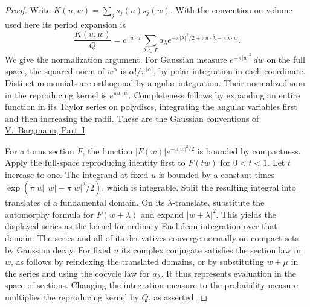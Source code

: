 \documentclass[a4paper,11pt]{article}
\theoremstyle{definition}
\theoremstyle{remark}
\numberwithin{equation}{section}
\begin{document}
\begin{proof}
Write \(K(u,w)=\sum_j s_j(u)\overline{s_j(w)}\). With the
convention on volume used here its period expansion is
\[
 \frac{K(u,w)}{Q}
  =e^{\pi u\cdot\bar w}
    \sum_{\lambda\in\Gamma}a_\lambda
      e^{-\pi|\lambda|^2/2+\pi u\cdot\bar\lambda
                                  -\pi\lambda\cdot\bar w}.
\]
We give the normalization argument. For Gaussian measure
\(e^{-\pi|w|^2}\,dw\) on the full space, the squared norm of
\(w^\alpha\) is \(\alpha!/\pi^{|\alpha|}\), by polar integration
in each coordinate. Distinct monomials are orthogonal by angular
integration. Their normalized sum in the reproducing kernel is
\(e^{\pi u\cdot\bar w}\). Completeness follows by expanding an
entire function in its Taylor series on polydiscs, integrating
the angular variables first and then increasing the radii. These
are the Gaussian conventions of
\href{https://doi.org/10.1002/cpa.3160140303}{V.~Bargmann, Part~I}.

For a torus section \(F\), the function
\(|F(w)|e^{-\pi|w|^2/2}\) is bounded by compactness. Apply the
full-space reproducing identity first to \(F(tw)\) for \(0<t<1\).
Let \(t\) increase to one. The integrand at fixed \(u\) is bounded
by a constant times
\(\exp(\pi|u|\,|w|-\pi|w|^2/2)\), which is integrable. Split the
resulting integral into translates of a fundamental domain. On
its \(\lambda\)-translate, substitute the automorphy formula for
\(F(w+\lambda)\) and expand \(|w+\lambda|^2\). This yields the
displayed series as the kernel for ordinary Euclidean integration
over that domain. The series and all of its derivatives converge
normally on compact sets by Gaussian decay. For fixed \(u\) its
complex conjugate satisfies the section law in \(w\), as follows
by reindexing the translated domains, or by substituting
\(w+\mu\) in the series and using the cocycle law for \(a_\lambda\).
It thus represents evaluation in the space of sections. Changing
the integration measure to the probability measure multiplies
the reproducing kernel by \(Q\), as asserted.


\end{proof}
\end{document}
